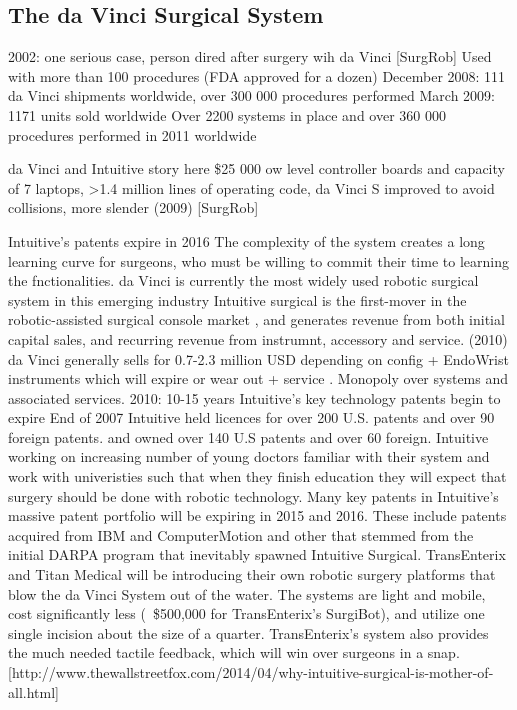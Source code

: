 \subsection{The da Vinci Surgical System}
2002: one serious case, person dired after surgery wih da Vinci [SurgRob]
Used with more than 100 procedures (FDA approved for a dozen)
December 2008: 111 da Vinci shipments worldwide, over 300 000 procedures performed
March 2009: 1171 units sold worldwide \citep{bib:intuitive_monopoly}
Over 2200 systems in place and over 360 000 procedures performed in 2011 worldwide \citep{bib:raven_ii}

da Vinci and Intuitive story here
\$25 000 ow level controller boards and capacity of 7 laptops, >1.4 million lines of operating code, da Vinci S improved to avoid collisions, more slender (2009) [SurgRob]

Intuitive's patents expire in 2016 \citep{bib:intuitive_monopoly}
The complexity of the system creates a long learning curve for surgeons, who must be willing to commit their time to learning the fnctionalities.
da Vinci is currently the most widely used robotic surgical system in this emerging industry \citep{bib:intuitive_monopoly}
Intuitive surgical is the first-mover in the robotic-assisted surgical console market \citep{bib:intuitive_monopoly}, and generates revenue from both initial capital sales, and recurring revenue from instrumnt, accessory and service.
(2010) da Vinci generally sells for 0.7-2.3 million USD depending on config + EndoWrist instruments which will expire or wear out + service \citep{bib:intuitive_monopoly}. Monopoly over systems and associated services.
2010: 10-15 years Intuitive's key technology patents begin to expire \citep{bib:intuitive_monopoly}
End of 2007 Intuitive held licences for over 200 U.S. patents and over 90 foreign patents. and owned over 140 U.S patents and over 60 foreign.
Intuitive working on increasing number of young doctors familiar with their system and work with univeristies such that when they finish education they will expect that surgery should be done with robotic technology. \citep{bib:intuitive_monopoly}
Many key patents in Intuitive's massive patent portfolio will be expiring in 2015 and 2016. These include patents acquired from IBM and ComputerMotion and other that stemmed from the initial DARPA program that inevitably spawned Intuitive Surgical. TransEnterix and Titan Medical will be introducing their own robotic surgery platforms that blow the da Vinci System out of the water. The systems are light and mobile, cost significantly less (~\$500,000 for TransEnterix's SurgiBot), and utilize one single incision about the size of a quarter. TransEnterix's system also provides the much needed tactile feedback, which will win over surgeons in a snap. [http://www.thewallstreetfox.com/2014/04/why-intuitive-surgical-is-mother-of-all.html]


